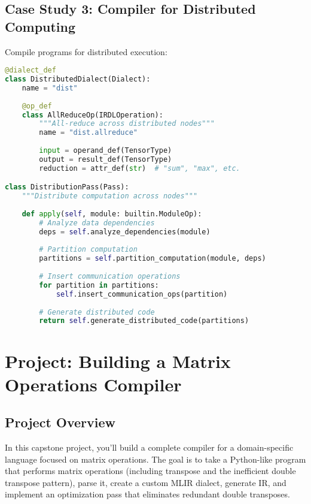 \documentclass[11pt,a4paper]{article}
\begin{document}
\subsection{Case Study 3: Compiler for Distributed Computing}

Compile programs for distributed execution:

\begin{lstlisting}[language=Python, caption=Distributed Computing Compiler]
@dialect_def
class DistributedDialect(Dialect):
    name = "dist"
    
    @op_def
    class AllReduceOp(IRDLOperation):
        """All-reduce across distributed nodes"""
        name = "dist.allreduce"
        
        input = operand_def(TensorType)
        output = result_def(TensorType)
        reduction = attr_def(str)  # "sum", "max", etc.

class DistributionPass(Pass):
    """Distribute computation across nodes"""
    
    def apply(self, module: builtin.ModuleOp):
        # Analyze data dependencies
        deps = self.analyze_dependencies(module)
        
        # Partition computation
        partitions = self.partition_computation(module, deps)
        
        # Insert communication operations
        for partition in partitions:
            self.insert_communication_ops(partition)
        
        # Generate distributed code
        return self.generate_distributed_code(partitions)
\end{lstlisting}

\section{Project: Building a Matrix Operations Compiler}

\subsection{Project Overview}

In this capstone project, you'll build a complete compiler for a domain-specific language focused on matrix operations. The goal is to take a Python-like program that performs matrix operations (including transpose and the inefficient double transpose pattern), parse it, create a custom MLIR dialect, generate IR, and implement an optimization pass that eliminates redundant double transposes.
\end{document}

